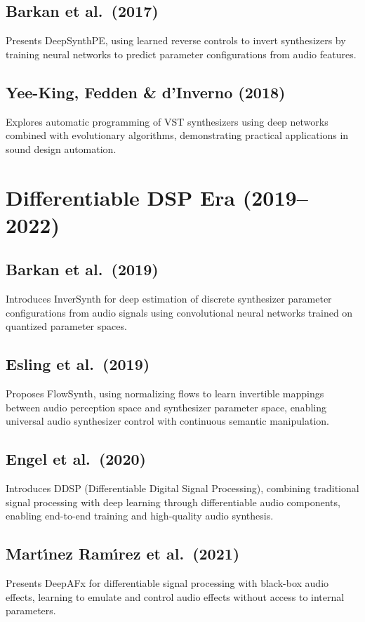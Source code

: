 \documentclass[12pt]{article}
\begin{document}
\subsection*{Barkan et al.\ (2017) \cite{Barkan2017}}
Presents DeepSynthPE, using learned reverse controls to invert synthesizers by training neural networks to predict parameter configurations from audio features.

\subsection*{Yee-King, Fedden \& d'Inverno (2018) \cite{YeeKing2018}}
Explores automatic programming of VST synthesizers using deep networks combined with evolutionary algorithms, demonstrating practical applications in sound design automation.

\section{Differentiable DSP Era (2019--2022)}

\subsection*{Barkan et al.\ (2019) \cite{Barkan2019}}
Introduces InverSynth for deep estimation of discrete synthesizer parameter configurations from audio signals using convolutional neural networks trained on quantized parameter spaces.

\subsection*{Esling et al.\ (2019) \cite{Esling2019}}
Proposes FlowSynth, using normalizing flows to learn invertible mappings between audio perception space and synthesizer parameter space, enabling universal audio synthesizer control with continuous semantic manipulation.

\subsection*{Engel et al.\ (2020) \cite{engel2020ddsp}}
Introduces DDSP (Differentiable Digital Signal Processing), combining traditional signal processing with deep learning through differentiable audio components, enabling end-to-end training and high-quality audio synthesis.

\subsection*{Mart\'{\i}nez Ram\'{\i}rez et al.\ (2021) \cite{Martinez2021}}
Presents DeepAFx for differentiable signal processing with black-box audio effects, learning to emulate and control audio effects without access to internal parameters.
\end{document}
